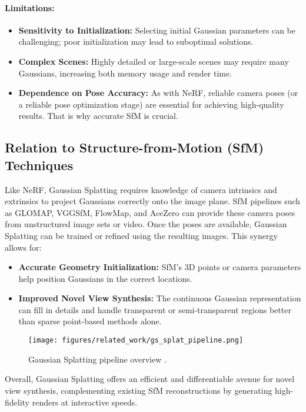 \paragraph{Limitations:}
\begin{itemize}
    \item \textbf{Sensitivity to Initialization:} Selecting initial Gaussian parameters can be challenging; poor initialization may lead to suboptimal solutions.
    \item \textbf{Complex Scenes:} Highly detailed or large-scale scenes may require many Gaussians, increasing both memory usage and render time.
    \item \textbf{Dependence on Pose Accuracy:} As with NeRF, reliable camera poses (or a reliable pose optimization stage) are essential for achieving high-quality results. That is why accurate SfM is crucial.
\end{itemize}

\subsection{Relation to Structure-from-Motion (SfM) Techniques}
Like NeRF, Gaussian Splatting requires knowledge of camera intrinsics and extrinsics to project Gaussians correctly onto the image plane.
SfM pipelines such as GLOMAP, VGGSfM, FlowMap, and AceZero can provide these camera poses from unstructured image sets or video.
Once the poses are available, Gaussian Splatting can be trained or refined using the resulting images.
This synergy allows for:
\begin{itemize}
    \item \textbf{Accurate Geometry Initialization:} SfM's 3D points or camera parameters help position Gaussians in the correct locations.
    \item \textbf{Improved Novel View Synthesis:} The continuous Gaussian representation can fill in details and handle transparent or semi-transparent regions better than sparse point-based methods alone.
\end{itemize}

\begin{figure}[H]
    \centering
    \texttt{[image: figures/related\_work/gs\_splat\_pipeline.png]}
    \caption{Gaussian Splatting pipeline overview \cite{kerbl20233dgaussiansplattingrealtime}.}
    \label{fig:gaussian_splatting}
\end{figure}

Overall, Gaussian Splatting offers an efficient and differentiable avenue for novel view synthesis, complementing existing SfM reconstructions by generating high-fidelity renders at interactive speeds.